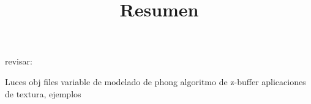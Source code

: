\documentclass[letterpaper,11pt]{article} %
\title{\bfseries Resumen}
\author{}
\date{}
\begin{document}
revisar:

Luces
obj files
variable de modelado de phong
algoritmo de z-buffer
aplicaciones de textura, ejemplos
\end{document}
